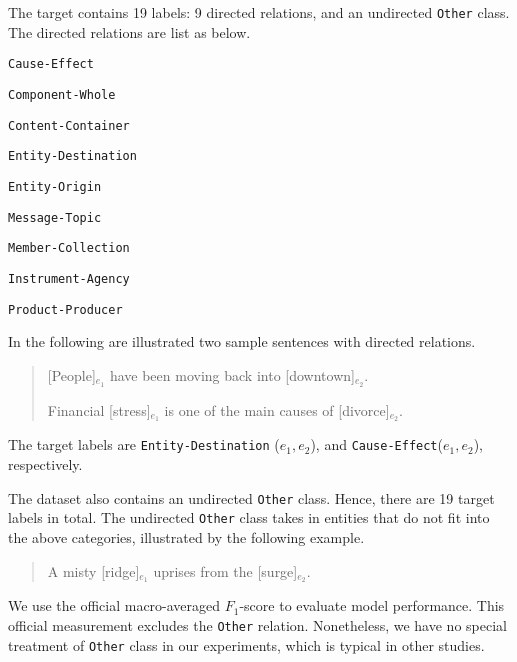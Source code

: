 \documentclass[11pt,a4paper]{article}
\begin{document}
The target contains 19 labels: 9 directed relations, and an undirected \verb|Other| class.
The directed relations are list as below.


\smallskip
\begin{compactitem}
\item \verb|Cause-Effect|

\item \verb|Component-Whole|

\item \verb|Content-Container|

\item \verb|Entity-Destination|

\item \verb|Entity-Origin|

\item \verb|Message-Topic|

\item \verb|Member-Collection|

\item \verb|Instrument-Agency|

\item \verb|Product-Producer|
\end{compactitem}

\smallskip
In the following are illustrated two sample sentences with directed relations.

\begin{quote}
[People]$_{e_1}$ have been moving back into [downtown]$_{e_2}$.

Financial [stress]$_{e_1}$ is one of the main causes of [divorce]$_{e_2}$.

\end{quote}
The target labels are \verb|Entity-Destination| ($e_1, e_2$),
and \verb|Cause-Effect|($e_1, e_2$), respectively.

The dataset also contains an undirected \verb|Other| class.
Hence, there are 19 target labels in total.
The undirected \verb|Other| class takes in entities that do not
fit into the above categories, illustrated by the following example.


\begin{quote}
A misty [ridge]$_{e_1}$ uprises from the [surge]$_{e_2}$.
\end{quote}

We use the official macro-averaged $F_1$-score to evaluate model performance.
This official measurement excludes the \verb|Other| relation.
Nonetheless, we have no special treatment of \verb|Other| class in our experiments,
which is typical in other studies.
\end{document}
